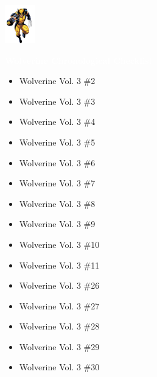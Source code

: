 \documentclass[12pt]{article}
\newcommand{\checkbox}{\raisebox{0.0ex}{\fbox{\rule{0ex}{1.5ex} \rule{1.5ex}{0ex}}}}
\begin{document}
\newpage
{}
\begin{center}
    \vspace*{2cm}
    \includegraphics[width=0.1\textwidth]{wolverine.png}
    \vspace{0.3cm}

    {\Huge \textbf{\textcolor{white}{Wolverine Chronological Checklist}}}
\end{center}
\vspace{0.3cm}
\noindent
\begin{tcolorbox}[
  colback=white!95!gray, colframe=black,
  width=\textwidth, arc=4mm, auto outer arc,
  boxrule=0.8pt,
  left=8pt,right=8pt,top=8pt,bottom=8pt
]
\begin{itemize}[left=0pt,label={\checkbox}]
  \item Wolverine Vol. 3 \#2
  \item Wolverine Vol. 3 \#3
  \item Wolverine Vol. 3 \#4
  \item Wolverine Vol. 3 \#5
  \item Wolverine Vol. 3 \#6
  \item Wolverine Vol. 3 \#7
  \item Wolverine Vol. 3 \#8
  \item Wolverine Vol. 3 \#9
  \item Wolverine Vol. 3 \#10
  \item Wolverine Vol. 3 \#11
  \item Wolverine Vol. 3 \#26
  \item Wolverine Vol. 3 \#27
  \item Wolverine Vol. 3 \#28
  \item Wolverine Vol. 3 \#29
  \item Wolverine Vol. 3 \#30
\end{itemize}
\end{tcolorbox}
\end{document}
